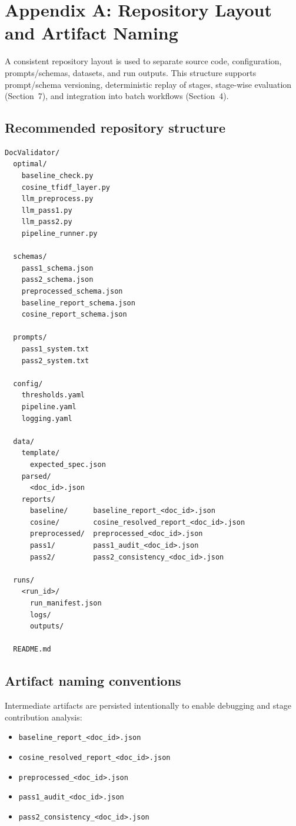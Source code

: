 
\appendix

\section{Appendix A: Repository Layout and Artifact Naming}
\label{app:repo_layout}

A consistent repository layout is used to separate source code, configuration, prompts/schemas, datasets, and run outputs. This structure supports prompt/schema versioning, deterministic replay of stages, stage-wise evaluation (Section~7), and integration into batch workflows (Section~4).

\subsection{Recommended repository structure}
\begin{verbatim}
DocValidator/
  optimal/
    baseline_check.py
    cosine_tfidf_layer.py
    llm_preprocess.py
    llm_pass1.py
    llm_pass2.py
    pipeline_runner.py

  schemas/
    pass1_schema.json
    pass2_schema.json
    preprocessed_schema.json
    baseline_report_schema.json
    cosine_report_schema.json

  prompts/
    pass1_system.txt
    pass2_system.txt

  config/
    thresholds.yaml
    pipeline.yaml
    logging.yaml

  data/
    template/
      expected_spec.json
    parsed/
      <doc_id>.json
    reports/
      baseline/      baseline_report_<doc_id>.json
      cosine/        cosine_resolved_report_<doc_id>.json
      preprocessed/  preprocessed_<doc_id>.json
      pass1/         pass1_audit_<doc_id>.json
      pass2/         pass2_consistency_<doc_id>.json

  runs/
    <run_id>/
      run_manifest.json
      logs/
      outputs/

  README.md
\end{verbatim}

\subsection{Artifact naming conventions}
Intermediate artifacts are persisted intentionally to enable debugging and stage contribution analysis:
\begin{itemize}
    \item \texttt{baseline\_report\_<doc\_id>.json}
    \item \texttt{cosine\_resolved\_report\_<doc\_id>.json}
    \item \texttt{preprocessed\_<doc\_id>.json}
    \item \texttt{pass1\_audit\_<doc\_id>.json}
    \item \texttt{pass2\_consistency\_<doc\_id>.json}
\end{itemize}


